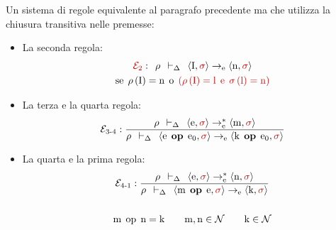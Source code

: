 \documentclass[a4paper]{article}
\begin{document}
 	Un sistema di regole equivalente al paragrafo precedente ma che utilizza la chiusura transitiva nelle premesse:
 	\begin{itemize} 		
 		\item La seconda regola:
 		\begin{gather*}
 			\textcolor{Red3}{\mathcal{E}_{2}} : \:\: \rho \:\: \vdash_{\Delta} \:\: \left\langle \mathrm{I}, \textcolor{Red3}{\sigma} \right\rangle \rightarrow_{\mathrm{e}} \left\langle \mathrm{n}, \textcolor{Red3}{\sigma} \right\rangle \\
 			\mathrm{se} \:\: \rho \left(\mathrm{I}\right) = \mathrm{n} \:\: \mathrm{o} \:\: \textcolor{Red3}{\left(\rho\left(\mathrm{I}\right) = \mathrm{l} \:\: \mathrm{e} \:\: \sigma\left(\mathrm{l}\right) = \mathrm{n}\right)}
 		\end{gather*}
 		
 		\item La terza e la quarta regola:
 		\begin{equation*}
 			\mathcal{E}_{3\text{-}4} : \dfrac{
 				\rho \:\: \vdash_{\Delta} \:\: \left\langle \mathrm{e}, \textcolor{Red3}{\sigma} \right\rangle \rightarrow^{*}_{\mathrm{e}} \left\langle \mathrm{m}, \textcolor{Red3}{\sigma} \right\rangle
 			}{
 				\rho \:\: \vdash_{\Delta} \:\: \left\langle \mathrm{e} \:\: \mathbf{op} \:\: \mathrm{e}_{0}, \textcolor{Red3}{\sigma} \right\rangle \rightarrow_{\mathrm{e}} \left\langle \mathrm{k} \:\: \mathbf{op} \:\: \mathrm{e}_{0}, \textcolor{Red3}{\sigma} \right\rangle
 			}
 		\end{equation*}
 		
 		\item La quarta e la prima regola:
 		\begin{gather*}
 			\mathcal{E}_{4\text{-}1} : \dfrac{
 				\rho \:\: \vdash_{\Delta} \:\: \left\langle \mathrm{e}, \textcolor{Red3}{\sigma} \right\rangle \rightarrow^{*}_{\mathrm{e}} \left\langle \mathrm{n}, \textcolor{Red3}{\sigma} \right\rangle
 			}{
 				\rho \:\: \vdash_{\Delta} \:\: \left\langle \mathrm{m} \:\: \mathbf{op} \:\: \mathrm{e}, \textcolor{Red3}{\sigma} \right\rangle \rightarrow_{\mathrm{e}} \left\langle \mathrm{k}, \textcolor{Red3}{\sigma} \right\rangle
 			} \\
 			\\
 			\mathrm{m} \:\: \mathrm{op} \:\: \mathrm{n} = \mathrm{k} \hspace{2em} \mathrm{m,n} \in \mathcal{N} \hspace{2em} \mathrm{k} \in \mathcal{N}
 		\end{gather*}
 		

\end{itemize}
\end{document}
